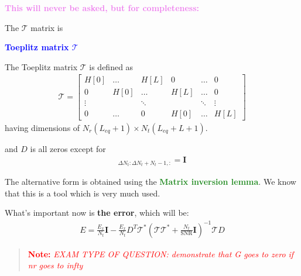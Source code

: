 \documentclass[a4paper, 12pt]{book}
\begin{document}
\begin{tcolorbox}[colback=violet!5, colframe=violet, boxrule=0.5pt, sharp corners]
    \textbf{\textcolor{violet}{ This will never be asked, but for completeness:}}
    \vspace{0.5em}
    
    The $\mathcal{T}$ matrix is
    
    \begin{tcolorbox}[colback=white, colframe=blue, boxrule=0.5pt, sharp corners]
        \textbf{\textcolor{blue}{ Toeplitz matrix $\mathcal{T}$}}
        \vspace{0.5em}
        
        The Toeplitz matrix $\mathcal{T}$ is defined as
        \begin{align}
            \mathcal{T} = \begin{bmatrix}
                H[0] & \dots & H[L] & 0 & \dots & 0 \\
                0 & H[0] & \dots & H[L] & \dots & 0 \\
                \vdots & & \ddots & & \ddots & \vdots \\
                0 & \dots & 0 & H[0] & \dots & H[L]
            \end{bmatrix} \label{eq:2.136}
        \end{align}
        having dimensions of $N_r(L_{eq}+1) \times N_t(L_{eq}+L+1)$.
    \end{tcolorbox}
    \vspace{0.5em}
    
    and $D$ is all zeros except for
    \begin{align}
        [D]_{\Delta N_t : \Delta N_t + N_t - 1, :} = \mathbf{I}
    \end{align}
\end{tcolorbox}

The alternative form is obtained using the \textbf{\textcolor{ForestGreen}{Matrix inversion lemma}}.
We know that this is a tool which is very much used.

What's important now is \textbf{the error}, which will be:
\begin{align}
    E = \frac{E_x}{N_t} \mathbf{I} - \frac{E_x}{N_t} D^T \mathcal{T}^* \left( \mathcal{T}\mathcal{T}^* + \frac{N_t}{\text{SNR}} \mathbf{I} \right)^{-1} \mathcal{T} D \label{eq:2.176}
\end{align}

\begin{quote}
    \textbf{\textcolor{red}{\small {} Note:}}
    \textit{\textcolor{red}{EXAM TYPE OF QUESTION: demonstrate that G goes to zero if nr goes to infty}}
\end{quote}
\end{document}
